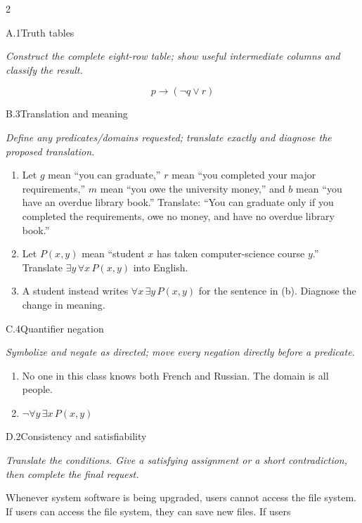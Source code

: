 \documentclass[9pt]{extarticle}
\begin{document}
\begin{multicols}{2}
\begin{CoreProblem}{A.1}{Truth tables}
{\scriptsize\textit{Construct the complete eight-row table; show useful intermediate columns and classify the result.}\par}
\[
  p\to(\neg q\lor r)
\]
\end{CoreProblem}
\begin{CoreProblem}{B.3}{Translation and meaning}
{\scriptsize\textit{Define any predicates/domains requested; translate exactly and diagnose the proposed translation.}\par}
\begin{enumerate}[label=(\alph*)]
  \item Let $g$ mean ``you can graduate,'' $r$ mean ``you completed your major
        requirements,'' $m$ mean ``you owe the university money,'' and $b$
        mean ``you have an overdue library book.'' Translate: ``You can
        graduate only if you completed the requirements, owe no money, and
        have no overdue library book.''
  \item Let $P(x,y)$ mean ``student $x$ has taken computer-science course
        $y$.'' Translate $\exists y\,\forall x\,P(x,y)$ into English.
  \item A student instead writes $\forall x\,\exists y\,P(x,y)$ for the
        sentence in (b). Diagnose the change in meaning.
\end{enumerate}
\end{CoreProblem}
\begin{CoreProblem}{C.4}{Quantifier negation}
{\scriptsize\textit{Symbolize and negate as directed; move every negation directly before a predicate.}\par}
\begin{enumerate}[label=(\alph*)]
  \item No one in this class knows both French and Russian. The domain is all
        people.
  \item $\neg\forall y\,\exists x\,P(x,y)$
\end{enumerate}
\end{CoreProblem}
\columnbreak
\begin{CoreProblem}{D.2}{Consistency and satisfiability}
{\scriptsize\textit{Translate the conditions. Give a satisfying assignment or a short contradiction, then complete the final request.}\par}
Whenever system software is being upgraded, users cannot access the file
system. If users can access the file system, they can save new files. If users

\end{CoreProblem}
\end{multicols}
\end{document}
